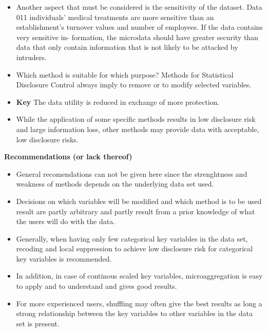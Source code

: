 \documentclass{beamer}
\begin{document}
\begin{frame}
	\begin{itemize}
\item Another aspect that must be considered is the sensitivity of the dataset. Data
011 individuals’ medical treatments are more sensitive than an establishment’s
turnover values and number of employees. If the data contains very sensitive in-
formation, the microdata should have greater security than data that only contain
information that is not likely to be attacked by intruders.
\end{itemize}
\end{frame}
\begin{frame}
	\begin{itemize}
\item Which method is suitable for which purpose? Methods for Statistical Disclosure Control always imply to remove or to modify selected variables.
\item \textbf{Key} The data
utility is reduced in exchange of more protection. 
\item While the application of some
specific methods results in low disclosure risk and large information loss, other
methods may provide data with acceptable, low disclosure risks. 

\end{itemize}
\end{frame}
\begin{frame}
\textbf{Recommendations (or lack thereof)}
	\begin{itemize}
\item General recomendations can not be given here since the strenghtness and weakness of methods
depends on the underlying data set used.
\item  Decisions on which variables will be
modiﬁed and which method is to be used result are partly arbitrary and partly
result from a prior knowledge of what the users will do with the data.
\end{itemize}
\end{frame}
\begin{frame}
	\begin{itemize}
\item Generally, when having only few categorical key variables in the data set, recoding and local suppression to achieve low disclosure risk for categorical key
variables is recommended. 
\item In addition, in case of continous scaled key variables,
microaggregation is easy to apply and to understand and gives good results.
\item  For
more experienced users, shuffling may often give the best results as long a strong
relationship between the key variables to other variables in the data set is present.

\end{itemize}
\end{frame}
\end{document}
